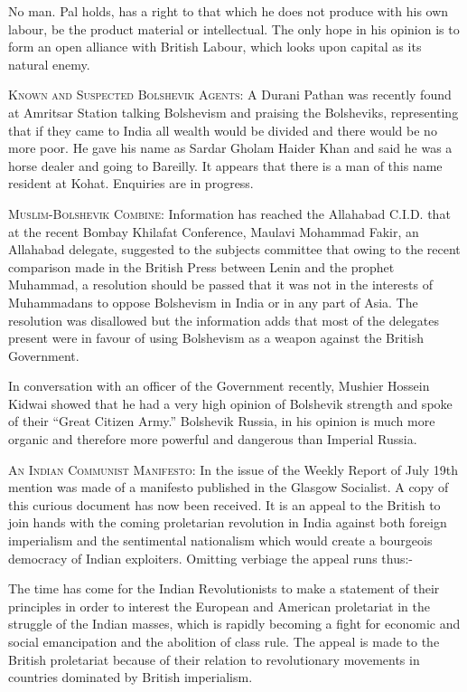 No man. Pal holds, has a right to that which he does not produce with his own labour, be the product material or intellectual. The only hope in his opinion is to form an open alliance with British Labour, which looks upon capital as its natural enemy. 

\textsc{Known and Suspected Bolshevik Agents:} A Durani Pathan was recently found at Amritsar Station talking Bolshevism and praising the Bolsheviks, representing that if they came to India all wealth would be divided and there would be no more poor. He gave his name as Sardar Gholam Haider Khan and said he was a horse dealer and going to Bareilly. It appears that there is a man of this name resident at Kohat. Enquiries are in progress. 

\textsc{Muslim-Bolshevik Combine:} Information has reached the Allahabad C.I.D. that at the recent Bombay Khilafat Conference, Maulavi Mohammad Fakir, an Allahabad delegate, suggested to the subjects committee that owing to the recent comparison made in the British Press between Lenin and the prophet Muhammad, a resolution should be passed that it was not in the interests of Muhammadans to oppose Bolshevism in India or in any part of Asia. The resolution was disallowed but the information adds that most of the delegates present were in favour of using Bolshevism as a weapon against the British Government. 

In conversation with an officer of the Government recently, Mushier Hossein Kidwai showed that he had a very high opinion of Bolshevik strength and spoke of their “Great Citizen Army.” Bolshevik Russia, in his opinion is much more organic and therefore more powerful and dangerous than Imperial Russia. 


\textsc{An Indian Communist Manifesto:} In the issue of the Weekly Report of July 19th mention was made of a manifesto published in the Glasgow Socialist. A copy of this curious document has now been received. It is an appeal to the British to join hands with the coming proletarian revolution in India against both foreign imperialism and the sentimental nationalism which would create a bourgeois democracy of Indian exploiters. Omitting verbiage the appeal runs thus:-

The time has come for the Indian Revolutionists to make a statement of their principles in order to interest the European and American proletariat in the struggle of the Indian masses, which is rapidly becoming a fight for economic and social emancipation and the abolition of class rule. The appeal is made to the British proletariat because of their relation to revolutionary movements in countries dominated by British imperialism.


